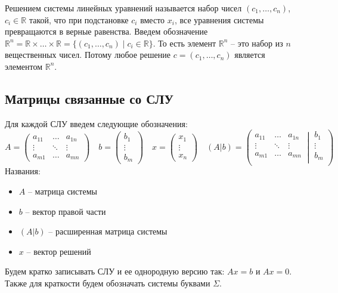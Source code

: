 Решением системы линейных уравнений называется набор чисел $(c_1,\ldots,c_n)$, $c_i\in\mathbb R$ такой, что при подстановке $c_i$ вместо $x_i$, все уравнения системы превращаются в верные равенства.
Введем обозначение $\mathbb R^n = \mathbb R\times \ldots \times \mathbb R = \{(c_1,\ldots,c_n)\mid c_i\in \mathbb R\}$.
То есть элемент $\mathbb R^n$ -- это набор из $n$ вещественных чисел.
Потому любое решение $c=(c_1,\ldots,c_n)$ является элементом $\mathbb R^n$.

\subsection{Матрицы связанные со СЛУ}

Для каждой СЛУ введем следующие обозначения:
\[
A= 
\begin{pmatrix}
a_{11}&\ldots& a_{1n}\\
\vdots&\ddots&\vdots\\
a_{m1}& \ldots &a_{mn}
\end{pmatrix}\quad
b = 
\begin{pmatrix}
b_1\\
\vdots\\
b_m
\end{pmatrix} \quad
x =
\begin{pmatrix}
x_1\\
\vdots\\
x_n
\end{pmatrix}\quad
(A|b) =
\left(\left.
\begin{matrix}
a_{11}&\ldots&a_{1n}\\
\vdots&\ddots&\vdots\\
a_{m1}&\ldots&a_{mn}\\
\end{matrix}
\:\right|\:
\begin{matrix}
b_1\\
\vdots\\
b_m\\
\end{matrix}\right)
\]
Названия:
\begin{itemize}
\item $A$ -- матрица системы

\item $b$ -- вектор правой части

\item $(A|b)$ -- расширенная матрица системы

\item $x$ -- вектор решений
\end{itemize}
Будем кратко записывать СЛУ и ее однородную версию так: $Ax = b$ и $Ax = 0$.
Также для краткости будем обозначать системы буквами $\Sigma$.

